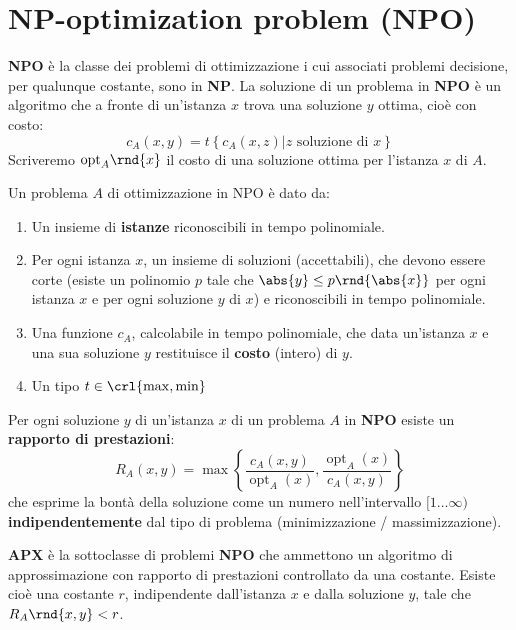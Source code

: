 \documentclass[\main/main.tex]{subfiles}
\begin{document}
\section{NP-optimization problem (NPO)}
\begin{multicols}{2}
\begin{definition}
    \textbf{NPO} è la classe dei problemi di ottimizzazione i cui associati problemi decisione, per qualunque costante, sono in \textbf{NP}. La soluzione di un problema in \textbf{NPO} è un algoritmo che a fronte di un'istanza \(x\) trova una soluzione \(y\) ottima, cioè con costo:
    \[
        c_{A}(x, y)=t\left\{c_{A}(x, z) | z \text { soluzione di } x\right\}
    \]
    Scriveremo \(\text{opt}_A\rnd{x}\) il costo di una soluzione ottima per l'istanza \(x\) di \(A\).
\end{definition}
\begin{definition}
    Un problema \(A\) di ottimizzazione in NPO è dato da:
    \begin{enumerate}
        \item Un insieme di \textbf{istanze} riconoscibili in tempo polinomiale.
        \item Per ogni istanza \(x\), un insieme di soluzioni (accettabili), che devono essere corte (esiste un polinomio \(p\) tale che \(\abs{y} \leq p\rnd{\abs{x}}\) per ogni istanza \(x\) e per ogni soluzione \(y\) di \(x\)) e riconoscibili in tempo polinomiale.
        \item Una funzione \(c_A\), calcolabile in tempo polinomiale, che data un'istanza \(x\) e una sua soluzione \(y\) restituisce il \textbf{costo} (intero) di \(y\). 
        \item Un tipo \(t \in \crl{\max, \min}\)
    \end{enumerate}
\end{definition}
\begin{definition}
    Per ogni soluzione \(y\) di un'istanza \(x\) di un problema \(A\) in \textbf{NPO} esiste un \textbf{rapporto di prestazioni}:
    \[
        R_{A}(x, y)=\max \left\{\frac{c_{A}(x, y)}{\operatorname{opt}_{A}(x)}, \frac{\operatorname{opt}_{A}(x)}{c_{A}(x, y)}\right\}
    \]
    che esprime la bontà della soluzione come un numero nell'intervallo \([1 \ldots \infty)\) \textbf{indipendentemente} dal tipo di problema (minimizzazione / massimizzazione).
\end{definition}
\begin{definition}[APX]
    \textbf{APX} è la sottoclasse di problemi \textbf{NPO} che ammettono un algoritmo di approssimazione con rapporto di prestazioni controllato da una costante. Esiste cioè una costante \(r\), indipendente dall'istanza \(x\) e dalla soluzione \(y\), tale che \(R_A\rnd{x,y}<r\).

\end{definition}
\end{multicols}
\end{document}

